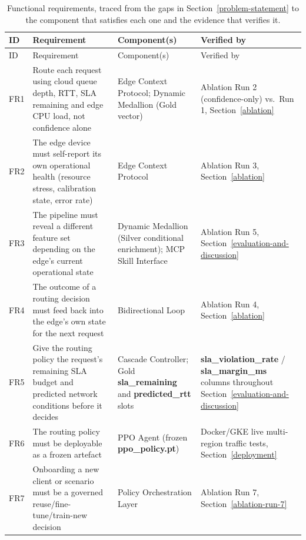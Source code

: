 {\small\setlength{\tabcolsep}{4pt}
\begin{longtable}{p{0.8cm}p{5.0cm}p{3.3cm}p{4.4cm}}
\caption{Functional requirements, traced from the gaps in Section~\ref{problem-statement}
to the component that satisfies each one and the evidence that verifies
it.}\label{tab:functional-requirements}\\
\toprule ID & Requirement & Component(s) & Verified by \\ \midrule
\endfirsthead
\toprule ID & Requirement & Component(s) & Verified by \\ \midrule
\endhead
FR1 & Route each request using cloud queue depth, RTT, SLA remaining
and edge CPU load, not confidence alone & Edge Context
Protocol; Dynamic Medallion (Gold vector) & Ablation Run 2
(confidence-only) vs.\ Run 1, Section~\ref{ablation} \\
FR2 & The edge device must self-report its own operational health
(resource stress, calibration state, error rate)  & Edge Context 
Protocol & Ablation Run 3, Section~\ref{ablation} \\
FR3 & The pipeline must reveal a different feature set depending on the
edge's current operational state
& Dynamic Medallion (Silver conditional enrichment); MCP Skill Interface
& Ablation Run 5, Section~\ref{evaluation-and-discussion} \\
FR4 & The outcome of a routing decision must feed back into the edge's
own state for the next request &
Bidirectional Loop & Ablation Run 4, Section~\ref{ablation} \\
FR5 & Give the routing policy the request's remaining SLA budget and
predicted network conditions before it decides & Cascade Controller;
Gold \textbf{sla\_remaining} and \textbf{predicted\_rtt} slots & \textbf{sla\_violation\_rate} /
\textbf{sla\_margin\_ms} columns throughout Section~\ref{evaluation-and-discussion} \\
FR6 & The routing policy must be deployable as a frozen artefact & PPO Agent (frozen
\textbf{ppo\_policy.pt}) & Docker/GKE live multi-region traffic tests,
Section~\ref{deployment} \\
FR7 & Onboarding a new client or scenario must be a governed
reuse/fine-tune/train-new decision & Policy
Orchestration Layer & Ablation Run 7, Section~\ref{ablation-run-7} \\
\bottomrule \end{longtable}}

